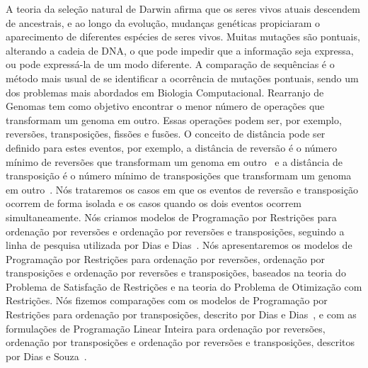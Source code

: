 A teoria da seleção natural de Darwin afirma que os seres vivos atuais
descendem de ancestrais, e ao longo da evolução, mudanças genéticas
propiciaram o aparecimento de diferentes espécies de seres vivos. Muitas
mutações são pontuais, alterando a cadeia de DNA, o que pode impedir que
a informação seja expressa, ou pode expressá-la de um modo diferente. A
comparação de sequências é o método mais usual de se identificar a
ocorrência de mutações pontuais, sendo um dos problemas mais abordados
em Biologia Computacional. Rearranjo de Genomas tem como objetivo
encontrar o menor número de operações que transformam um genoma em
outro. Essas operações podem ser, por exemplo, reversões, transposições,
fissões e fusões. O conceito de distância pode ser definido para estes
eventos, por exemplo, a distância de reversão é o número mínimo de
reversões que transformam um genoma em outro~\cite{BafnaPevzner*1996} e
a distância de transposição é o número mínimo de transposições que
transformam um genoma em outro~\cite{BafnaPevzner*1998}. Nós trataremos
os casos em que os eventos de reversão e transposição ocorrem de forma
isolada e os casos quando os dois eventos ocorrem simultaneamente. Nós
criamos modelos de Programação por Restrições para ordenação por
reversões e ordenação por reversões e transposições, seguindo a linha de
pesquisa utilizada por Dias e Dias~\cite{DiasDias*2009}. Nós
apresentaremos os modelos de Programação por Restrições para ordenação
por reversões, ordenação por transposições e ordenação por reversões e
transposições, baseados na teoria do Problema de Satisfação de
Restrições e na teoria do Problema de Otimização com Restrições. Nós
fizemos comparações com os modelos de Programação por Restrições para
ordenação por transposições, descrito por Dias e
Dias~\cite{DiasDias*2009}, e com as formulações de Programação Linear
Inteira para ordenação por reversões, ordenação por transposições e
ordenação por reversões e transposições, descritos por Dias e
Souza~\cite{DiasSouza*2007}.

